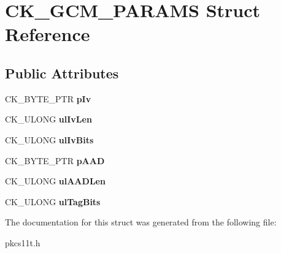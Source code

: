 \hypertarget{struct_c_k___g_c_m___p_a_r_a_m_s}{}\section{C\+K\+\_\+\+G\+C\+M\+\_\+\+P\+A\+R\+A\+MS Struct Reference}
\label{struct_c_k___g_c_m___p_a_r_a_m_s}
\subsection*{Public Attributes}
\begin{DoxyCompactItemize}
\item 
\mbox{\label{struct_c_k___g_c_m___p_a_r_a_m_s_a2ae117e4b42765507cd93983023c03e7}} 
C\+K\+\_\+\+B\+Y\+T\+E\+\_\+\+P\+TR {\bfseries p\+Iv}
\item 
\mbox{\label{struct_c_k___g_c_m___p_a_r_a_m_s_a0a57c78c922886cc6d7260ab0acb61fe}} 
C\+K\+\_\+\+U\+L\+O\+NG {\bfseries ul\+Iv\+Len}
\item 
\mbox{\label{struct_c_k___g_c_m___p_a_r_a_m_s_a352dfd3bba0f63669a6ed6b5db76d1bc}} 
C\+K\+\_\+\+U\+L\+O\+NG {\bfseries ul\+Iv\+Bits}
\item 
\mbox{\label{struct_c_k___g_c_m___p_a_r_a_m_s_a61180a497f53ae8e4b3a26004480fa42}} 
C\+K\+\_\+\+B\+Y\+T\+E\+\_\+\+P\+TR {\bfseries p\+A\+AD}
\item 
\mbox{\label{struct_c_k___g_c_m___p_a_r_a_m_s_a89208fe03593cd0accfd1473667b02a3}} 
C\+K\+\_\+\+U\+L\+O\+NG {\bfseries ul\+A\+A\+D\+Len}
\item 
\mbox{\label{struct_c_k___g_c_m___p_a_r_a_m_s_ae7009f51a60119f22340ca063291528c}} 
C\+K\+\_\+\+U\+L\+O\+NG {\bfseries ul\+Tag\+Bits}
\end{DoxyCompactItemize}


The documentation for this struct was generated from the following file\+:\begin{DoxyCompactItemize}
\item 
pkcs11t.\+h\end{DoxyCompactItemize}
